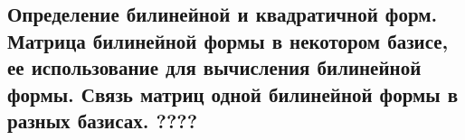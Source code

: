 {
\subsection{Определение билинейной и квадратичной форм. Матрица билинейной формы в некотором базисе, ее использование для вычисления билинейной формы. Связь матриц одной билинейной формы в разных базисах. ????}
}